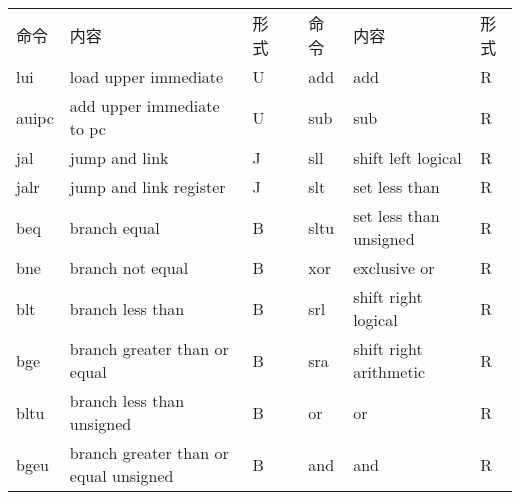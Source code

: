 \documentclass[../specifications.tex]{subfiles}
\begin{document}
  \begin{table*}[t]
    \begin{tabular}{|l|l|l|llll}
    \cline{1-3} \cline{5-7}
    命令    & 内容                                    & 形式 & \multicolumn{1}{l|}{} & \multicolumn{1}{l|}{命令}     & \multicolumn{1}{l|}{内容}                            & \multicolumn{1}{l|}{形式} \\ \cline{1-3} \cline{5-7}
    lui   & load upper immediate                  & U  & \multicolumn{1}{l|}{} & \multicolumn{1}{l|}{add}    & \multicolumn{1}{l|}{add}                           & \multicolumn{1}{l|}{R}  \\
    auipc & add upper immediate to pc             & U  & \multicolumn{1}{l|}{} & \multicolumn{1}{l|}{sub}    & \multicolumn{1}{l|}{sub}                           & \multicolumn{1}{l|}{R}  \\
    jal   & jump and link                         & J  & \multicolumn{1}{l|}{} & \multicolumn{1}{l|}{sll}    & \multicolumn{1}{l|}{shift left logical}            & \multicolumn{1}{l|}{R}  \\
    jalr  & jump and link register                & J  & \multicolumn{1}{l|}{} & \multicolumn{1}{l|}{slt}    & \multicolumn{1}{l|}{set less than}                 & \multicolumn{1}{l|}{R}  \\
    beq   & branch equal                          & B  & \multicolumn{1}{l|}{} & \multicolumn{1}{l|}{sltu}   & \multicolumn{1}{l|}{set less than unsigned}        & \multicolumn{1}{l|}{R}  \\
    bne   & branch not equal                      & B  & \multicolumn{1}{l|}{} & \multicolumn{1}{l|}{xor}    & \multicolumn{1}{l|}{exclusive or}                  & \multicolumn{1}{l|}{R}  \\
    blt   & branch less than                      & B  & \multicolumn{1}{l|}{} & \multicolumn{1}{l|}{srl}    & \multicolumn{1}{l|}{shift right logical}           & \multicolumn{1}{l|}{R}  \\
    bge   & branch greater than or equal          & B  & \multicolumn{1}{l|}{} & \multicolumn{1}{l|}{sra}    & \multicolumn{1}{l|}{shift right arithmetic}        & \multicolumn{1}{l|}{R}  \\
    bltu  & branch less than unsigned             & B  & \multicolumn{1}{l|}{} & \multicolumn{1}{l|}{or}     & \multicolumn{1}{l|}{or}                            & \multicolumn{1}{l|}{R}  \\
    bgeu  & branch greater than or equal unsigned & B  & \multicolumn{1}{l|}{} & \multicolumn{1}{l|}{and}    & \multicolumn{1}{l|}{and}                           & \multicolumn{1}{l|}{R}  \\

\end{tabular}
\end{table*}
\end{document}
